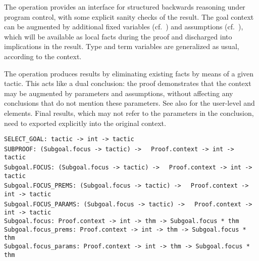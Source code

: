 \begin{isabellebody}
\begin{isamarkuptext}
  The  operation provides an interface for structured
  backwards reasoning under program control, with some explicit sanity
  checks of the result.  The goal context can be augmented by
  additional fixed variables (cf.\ ) and
  assumptions (cf.\ ), which will be available
  as local facts during the proof and discharged into implications in
  the result.  Type and term variables are generalized as usual,
  according to the context.

  The  operation produces results by eliminating
  existing facts by means of a given tactic.  This acts like a dual
  conclusion: the proof demonstrates that the context may be augmented
  by parameters and assumptions, without affecting any conclusions
  that do not mention these parameters.  See also
  \cite{isabelle-isar-ref} for the user-level \hyperlink{command.obtain}{\mbox{}} and
  \hyperlink{command.guess}{\mbox{}} elements.  Final results, which may not refer to
  the parameters in the conclusion, need to exported explicitly into
  the original context.%
\end{isamarkuptext}%
\isamarkuptrue%
%
\isadelimmlref
%
\endisadelimmlref
%
\isatagmlref
%
\begin{isamarkuptext}%
\begin{mldecls}
  \verb|SELECT_GOAL: tactic -> int -> tactic| \\
  \verb|SUBPROOF: (Subgoal.focus -> tactic) ->|\isasep\isanewline%
\verb|  Proof.context -> int -> tactic| \\
  \verb|Subgoal.FOCUS: (Subgoal.focus -> tactic) ->|\isasep\isanewline%
\verb|  Proof.context -> int -> tactic| \\
  \verb|Subgoal.FOCUS_PREMS: (Subgoal.focus -> tactic) ->|\isasep\isanewline%
\verb|  Proof.context -> int -> tactic| \\
  \verb|Subgoal.FOCUS_PARAMS: (Subgoal.focus -> tactic) ->|\isasep\isanewline%
\verb|  Proof.context -> int -> tactic| \\
  \verb|Subgoal.focus: Proof.context -> int -> thm -> Subgoal.focus * thm| \\
  \verb|Subgoal.focus_prems: Proof.context -> int -> thm -> Subgoal.focus * thm| \\
  \verb|Subgoal.focus_params: Proof.context -> int -> thm -> Subgoal.focus * thm| \\
  \end{mldecls}


\end{isamarkuptext}
\end{isabellebody}
